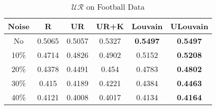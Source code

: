 \documentclass[\main/thesis.tex]{subfiles}
\begin{document}
\begin{table}[]
\centering
\caption{$\mathcal{UR}$ on Football Data}
\label{unsupervised_football}
\begin{tabular}{|c|c|c|c|c|c|}
\hline
Noise & R      & UR     & UR+K   & Louvain         & ULouvain        \\ \hline
No    & 0.5065 & 0.5057 & 0.5327 & \textbf{0.5497} & \textbf{0.5497} \\ \hline
10\%  & 0.4714 & 0.4826 & 0.4902 & 0.5152          & \textbf{0.5208} \\ \hline
20\%  & 0.4378 & 0.4491 & 0.454  & 0.4783          & \textbf{0.4802} \\ \hline
30\%  & 0.415  & 0.4189 & 0.4221 & 0.4384          & \textbf{0.4463} \\ \hline
40\%  & 0.4121 & 0.4008 & 0.4017 & 0.4134          & \textbf{0.4164} \\ \hline
\end{tabular}
\end{table}

\end{document}
